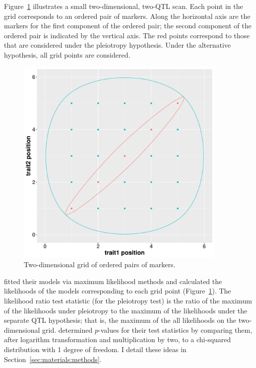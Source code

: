 \documentclass[oneside]{book}\usepackage[]{graphicx}\usepackage[]{color}
\newenvironment{knitrout}{}{} %
\begin{document}
Figure~\ref{fig:encircle} illustrates a small two-dimensional, two-QTL scan. 
Each point in the grid corresponds to an ordered pair of
markers. Along the horizontal axis are the markers for the first component of the
ordered pair; the second component of the ordered pair is indicated by the vertical
axis. The red points correspond to those that are considered under the pleiotropy
hypothesis. Under the alternative hypothesis, all grid points are considered.





\begin{knitrout}
\color{fgcolor}\begin{figure}
\includegraphics[width=4in,height=4in]{figure/encircle-1} \caption[Two-dimensional grid of ordered pairs of markers]{Two-dimensional grid of ordered pairs of markers.}\label{fig:encircle}
\end{figure}


\end{knitrout}



\citet{jiang1995multiple} fitted their models via maximum likelihood methods and calculated the likelihoods of the models
corresponding to each grid point (Figure~\ref{fig:encircle}).
The likelihood ratio test statistic (for the pleiotropy test)
is the ratio of the maximum
of the likelihoods under pleiotropy to the maximum of the likelihoods under
the separate QTL hypothesis; that is, the maximum of the all likelihoods on the two-dimensional grid. \citet{jiang1995multiple} determined
$p$-values for their test statistics by comparing
them, after logarithm transformation and multiplication by two,
to a chi-squared distribution with 1 degree of freedom. 
I detail these ideas in Section~\ref{sec:materials:methods}.
\end{document}
